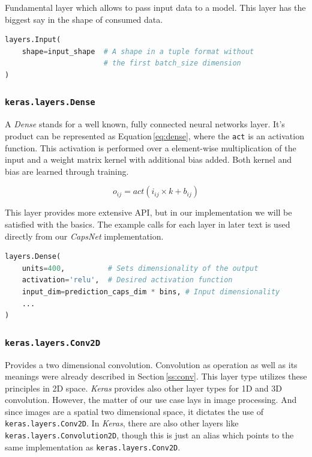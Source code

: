 Fundamental layer which allows to pass input data to a model. This layer has the biggest say in the shape of consumed data.

\pagebreak
\begin{lstlisting}[language=Python, caption=Input layer]
layers.Input(
    shape=input_shape  # A shape in a tuple format without
                       # the first batch_size dimension
)
\end{lstlisting}

\subsubsection{\texttt{keras.layers.Dense}}

A \textit{Dense} stands for a well known, fully connected neural networks layer. It's product can be represented as Equation\,\ref{eq:dense}, where the \texttt{act} is an activation function. This activation is performed over a element-wise multiplication of the input and a weight matrix kernel with additional bias added. Both kernel and bias are learned through training.

\begin{equation}
    o_{ij} = act(i_{ij} \times k + b_{ij})
    \label{eq:dense}
\end{equation}

This layer provides more extensive API, but in our implementation we will be satisfied with the basics. The example calls for each layer in later text is used directly from our \textit{CapsNet} implementation.

\begin{lstlisting}[language=Python, caption=Dense layer]
layers.Dense(
    units=400,          # Sets dimensionality of the output
    activation='relu',  # Desired activation function
    input_dim=prediction_caps_dim * bins, # Input dimensionality
    ...
)
\end{lstlisting}

\subsubsection{\texttt{keras.layers.Conv2D}}

Provides a two dimensional convolution. Convolution as operation as well as its meanings were already described in Section\,\ref{ss:conv}. This layer type utilizes these principles in 2D space. \textit{Keras} provides also other layer types for 1D and 3D convolution. However, the matter of our use case lays in image processing. And since images are a spatial two dimensional space, it dictates the use of \texttt{keras.layers.Conv2D}. In \textit{Keras}, there are also other layers like \texttt{keras.layers.Convolution2D}, though this is just an alias which points to the same implementation as \texttt{keras.layers.Conv2D}.

